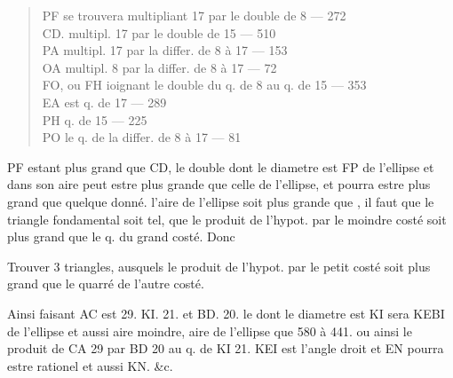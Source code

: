 \documentclass[11pt,a4paper]{article}
\begin{document}
\begin{quote}
PF se trouvera multipliant 17 par le double de 8 --- 272\\
CD. multipl. 17 par le double de 15 --- 510\\
PA multipl. 17 par la differ. de 8 à 17 --- 153\\
OA multipl. 8 par la differ. de 8 à 17 --- 72\\
FO, ou FH ioignant le double du q. de 8 au q. de 15 --- 353\\
EA est q. de 17 --- 289\\
PH q. de 15 --- 225\\
PO le q. de la differ. de 8 à 17 --- 81
\end{quote}

PF estant plus grand que CD, le double dont le diametre est FP \ill{} \ill{} \ill{} de l'ellipse et dans son aire peut estre plus grande que celle de l'ellipse, et \ill{} pourra estre plus grand que quelque  donné. \ill{} \ill{} \ill{} \ill{} \ill{} \ill{} l'aire \struck{\ill{}} de l'ellipse soit plus grande que \ill{} \ill{}, il faut que le triangle fondamental soit tel, que le produit de l'hypot. par le moindre costé soit plus grand que le q. du grand costé. Donc

Trouver 3 triangles, ausquels le produit de l'hypot. par le petit costé soit plus grand que le quarré de l'autre costé.

Ainsi faisant AC est 29. KI. 21. et BD. 20. le  dont le diametre est KI sera KEBI \ill{} \ill{} \ill{} de l'ellipse et aussi aire moindre, \ill{} \ill{} aire \ill{} \ill{} de l'ellipse que 580 à 441. ou ainsi le produit de CA \struck{\ill{}} 29 par BD 20 au q. de KI 21. \ill{} KEI est l'angle droit \ill{} et EN pourra estre rationel et aussi KN. \&c.
\end{document}

